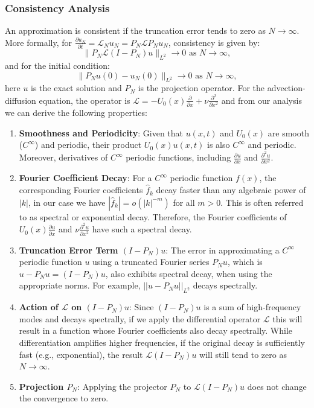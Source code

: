 \subsubsection{Consistency Analysis}
An approximation is consistent if the truncation error tends to zero as $N \rightarrow \infty$. More formally, for $\frac{\partial u_N}{\partial t} = \mathcal{L}_N u_N = P_N \mathcal{L} P_N u_N$, consistency is given by:
\begin{equation}
	\|P_N \mathcal{L}(I - P_N)u\|_{L^2} \rightarrow 0 \text{ as } N \rightarrow \infty,
	\label{eq:consistency_cond1}
\end{equation}
and for the initial condition:
\begin{equation}
	\|P_N u(0) - u_N(0)\|_{L^2} \rightarrow 0 \text{ as } N \rightarrow \infty,
	\label{eq:consistency_cond2}
\end{equation}
here $u$ is the exact solution and $P_N$ is the projection operator.
For the advection-diffusion equation, the operator is $\mathcal{L} = -U_0(x)\frac{\partial}{\partial x} + \nu\frac{\partial^2}{\partial x^2}$ and from our analysis we can derive the following properties:
\begin{enumerate}
	\item \textbf{Smoothness and Periodicity}: Given that $u(x,t)$ and $U_0(x)$ are smooth ($C^\infty$) and periodic, their product $U_0(x)u(x,t)$ is also $C^\infty$ and periodic. Moreover, derivatives of $C^\infty$ periodic functions, including $\frac{\partial u}{\partial x}$ and $\frac{\partial^2 u}{\partial x^2}$.
	\item \textbf{Fourier Coefficient Decay}: For a $C^\infty$ periodic function $f(x)$, the corresponding Fourier coefficients $\hat{f}_k$ decay faster than any algebraic power of $|k|$, in our case we have $|\hat{f}_k| = o(|k|^{-m})$ for all $m > 0$. This is often referred to as spectral or exponential decay. Therefore, the Fourier coefficients of $U_0(x)\frac{\partial u}{\partial x}$ and $\nu\frac{\partial^2 u}{\partial x^2}$ have such a spectral decay.
	\item \textbf{Truncation Error Term $(I-P_N)u$}: The error in approximating a $C^\infty$ periodic function $u$ using a truncated Fourier series $P_N u$, which is $u - P_N u = (I-P_N)u$, also exhibits spectral decay, when using the appropriate norms. For example, $||u - P_N u||_{L^2}$ decays spectrally.
	\item \textbf{Action of $\mathcal{L}$ on $(I-P_N)u$}: Since $(I-P_N)u$ is a sum of high-frequency modes and decays spectrally, if we apply the differential operator $\mathcal{L}$ this will result in a function whose Fourier coefficients also decay spectrally. While differentiation amplifies higher frequencies, if the original decay is sufficiently fast (e.g., exponential), the result $\mathcal{L}(I-P_N)u$ will still tend to zero as $N \rightarrow \infty$.
	\item \textbf{Projection $P_N$}: Applying the projector $P_N$ to $\mathcal{L}(I-P_N)u$ does not change the convergence to zero.
\end{enumerate}
